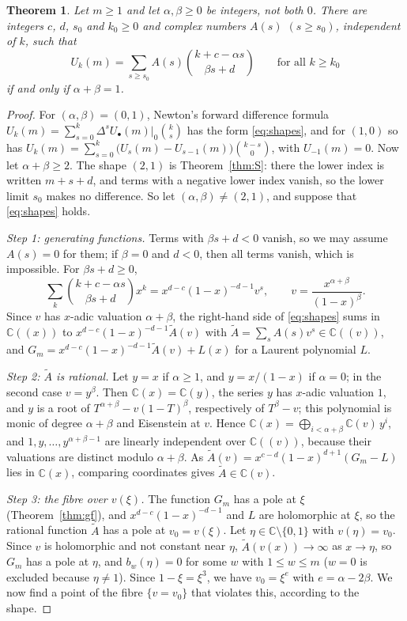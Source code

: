 \documentclass[11pt]{amsart}
\newtheorem{theorem}{Theorem}[section]
\theoremstyle{definition}
\newcommand{\C}{\mathbb{C}}
\begin{document}
\begin{theorem}\label{thm:shapes}
Let $m\ge1$ and let $\alpha,\beta\ge0$ be integers, not both $0$. There are integers $c$, $d$, $s_0$ and $k_0\ge0$ and complex numbers $A(s)$ $(s\ge s_0)$, independent of $k$, such that
\begin{equation}\label{eq:shapes}
  U_k(m)=\sum_{s\ge s_0}A(s)\binom{k+c-\alpha s}{\beta s+d}\qquad\text{for all }k\ge k_0
\end{equation}
if and only if $\alpha+\beta=1$.
\end{theorem}

\begin{proof}
For $(\alpha,\beta)=(0,1)$, Newton's forward difference formula $U_k(m)=\sum_{s=0}^{k}\Delta^sU_{\bullet}(m)\big|_{0}\binom{k}{s}$ has the form \eqref{eq:shapes}, and for $(1,0)$ so has $U_k(m)=\sum_{s=0}^{k}\bigl(U_s(m)-U_{s-1}(m)\bigr)\binom{k-s}{0}$, with $U_{-1}(m)=0$. Now let $\alpha+\beta\ge2$. The shape $(2,1)$ is Theorem~\ref{thm:S}: there the lower index is written $m+s+d$, and terms with a negative lower index vanish, so the lower limit $s_0$ makes no difference. So let $(\alpha,\beta)\ne(2,1)$, and suppose that \eqref{eq:shapes} holds.

\emph{Step 1: generating functions.} Terms with $\beta s+d<0$ vanish, so we may assume $A(s)=0$ for them; if $\beta=0$ and $d<0$, then all terms vanish, which is impossible. For $\beta s+d\ge0$,
\[
  \sum_k\binom{k+c-\alpha s}{\beta s+d}x^k=x^{d-c}(1-x)^{-d-1}v^{s},\qquad v=\frac{x^{\alpha+\beta}}{(1-x)^{\beta}}.
\]
Since $v$ has $x$-adic valuation $\alpha+\beta$, the right-hand side of \eqref{eq:shapes} sums in $\C((x))$ to $x^{d-c}(1-x)^{-d-1}\tilde A(v)$ with $\tilde A=\sum_sA(s)v^s\in\C((v))$, and $G_m=x^{d-c}(1-x)^{-d-1}\tilde A(v)+L(x)$ for a Laurent polynomial $L$.

\emph{Step 2: $\tilde A$ is rational.} Let $y=x$ if $\alpha\ge1$, and $y=x/(1-x)$ if $\alpha=0$; in the second case $v=y^\beta$. Then $\C(x)=\C(y)$, the series $y$ has $x$-adic valuation $1$, and $y$ is a root of $T^{\alpha+\beta}-v(1-T)^\beta$, respectively of $T^\beta-v$; this polynomial is monic of degree $\alpha+\beta$ and Eisenstein at $v$. Hence $\C(x)=\bigoplus_{i<\alpha+\beta}\C(v)\,y^i$, and $1,y,\dots,y^{\alpha+\beta-1}$ are linearly independent over $\C((v))$, because their valuations are distinct modulo $\alpha+\beta$. As $\tilde A(v)=x^{c-d}(1-x)^{d+1}(G_m-L)$ lies in $\C(x)$, comparing coordinates gives $\tilde A\in\C(v)$.

\emph{Step 3: the fibre over $v(\xi)$.} The function $G_m$ has a pole at $\xi$ (Theorem~\ref{thm:gf}), and $x^{d-c}(1-x)^{-d-1}$ and $L$ are holomorphic at $\xi$, so the rational function $\tilde A$ has a pole at $v_0=v(\xi)$. Let $\eta\in\C\setminus\{0,1\}$ with $v(\eta)=v_0$. Since $v$ is holomorphic and not constant near $\eta$, $\tilde A(v(x))\to\infty$ as $x\to\eta$, so $G_m$ has a pole at $\eta$, and $b_w(\eta)=0$ for some $w$ with $1\le w\le m$ ($w=0$ is excluded because $\eta\ne1$). Since $1-\xi=\xi^3$, we have $v_0=\xi^{e}$ with $e=\alpha-2\beta$. We now find a point of the fibre $\{v=v_0\}$ that violates this, according to the shape.


\end{proof}
\end{document}
